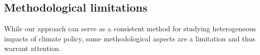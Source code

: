 \documentclass[12pt, a4paper]{article}
\begin{document}


\subsection{Methodological limitations}

While our approach can serve as a consistent method for studying heterogeneous impacts of climate policy, some methodological aspects are a limitation and thus warrant attention.
\end{document}
